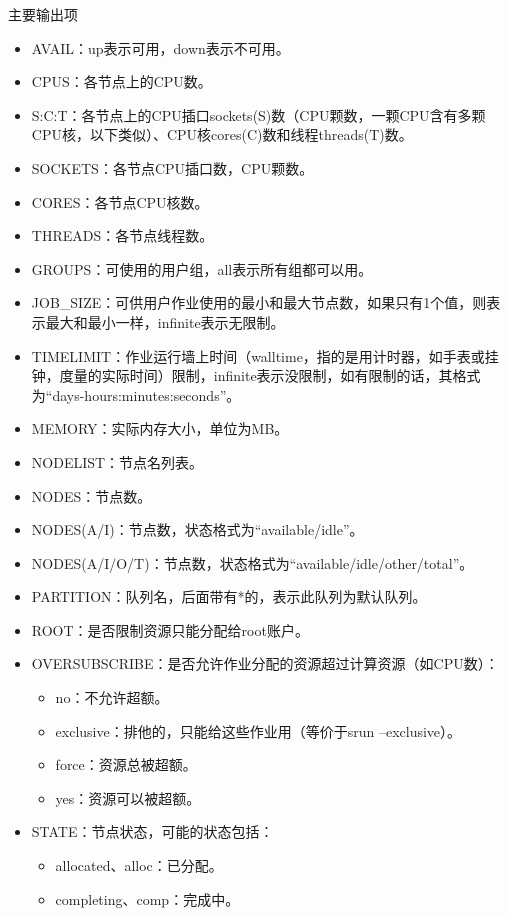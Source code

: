 \begin{frame}{主要输出项}
\begin{itemize}
	\item AVAIL：up表示可用，down表示不可用。
    \item CPUS：各节点上的CPU数。
    \item S:C:T：各节点上的CPU插口sockets(S)数（CPU颗数，一颗CPU含有多颗CPU核，以下类似）、CPU核cores(C)数和线程threads(T)数。
    \item SOCKETS：各节点CPU插口数，CPU颗数。
    \item CORES：各节点CPU核数。
    \item THREADS：各节点线程数。
    \item GROUPS：可使用的用户组，all表示所有组都可以用。
	\item JOB\_SIZE：可供用户作业使用的最小和最大节点数，如果只有1个值，则表示最大和最小一样，infinite表示无限制。
	\item TIMELIMIT：作业运行墙上时间（walltime，指的是用计时器，如手表或挂钟，度量的实际时间）限制，infinite表示没限制，如有限制的话，其格式为``days-hours:minutes:seconds''。
    \item MEMORY：实际内存大小，单位为MB。
    \item NODELIST：节点名列表。
    \item NODES：节点数。
    \item NODES(A/I)：节点数，状态格式为``available/idle''。
    \item NODES(A/I/O/T)：节点数，状态格式为``available/idle/other/total''。
	\item PARTITION：队列名，后面带有*的，表示此队列为默认队列。
    \item ROOT：是否限制资源只能分配给root账户。
    \item OVERSUBSCRIBE：是否允许作业分配的资源超过计算资源（如CPU数）：
	\begin{itemize}
		\item no：不允许超额。
		\item exclusive：排他的，只能给这些作业用（等价于srun --exclusive）。
		\item force：资源总被超额。
		\item yes：资源可以被超额。
	\end{itemize}
     \item STATE：节点状态，可能的状态包括：
\begin{itemize}
	\item	allocated、alloc：已分配。
	\item	completing、comp：完成中。

\end{itemize}
\end{itemize}
\end{frame}
